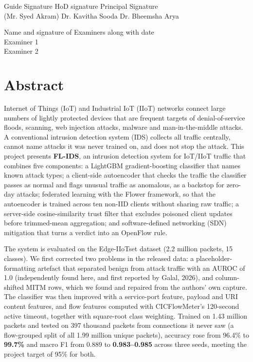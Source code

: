 \documentclass[12pt,a4paper]{report}
\begin{document}
\vspace{2cm}
\begin{flushleft}
Guide Signature\hspace{30mm} HoD signature \hspace{25mm} Principal Signature\\
(Mr. Syed Akram) \hspace{25mm} Dr. Kavitha Sooda \hspace{19mm} Dr. Bheemsha Arya
\end{flushleft}
\vspace{2cm}
\begin{flushleft}
Name and signature of Examiners along with date \\
\vspace {1cm}
Examiner 1 \\
\vspace {1cm}
Examiner 2 \\

\end{flushleft}



\chapter*{Abstract}
\thispagestyle{empty}
Internet of Things (IoT) and Industrial IoT (IIoT) networks connect large numbers of lightly protected devices that are frequent targets of denial-of-service floods, scanning, web injection attacks, malware and man-in-the-middle attacks. A conventional intrusion detection system (IDS) collects all traffic centrally, cannot name attacks it was never trained on, and does not stop the attack. This project presents \textbf{FL-IDS}, an intrusion detection system for IoT/IIoT traffic that combines five components: a LightGBM gradient-boosting classifier that names known attack types; a client-side autoencoder that checks the traffic the classifier passes as normal and flags unusual traffic as anomalous, as a backstop for zero-day attacks; federated learning with the Flower framework, so that the autoencoder is trained across ten non-IID clients without sharing raw traffic; a server-side cosine-similarity trust filter that excludes poisoned client updates before trimmed-mean aggregation; and software-defined networking (SDN) mitigation that turns a verdict into an OpenFlow rule.

The system is evaluated on the Edge-IIoTset dataset (2.2 million packets, 15 classes). We first corrected two problems in the released data: a placeholder-formatting artefact that separated benign from attack traffic with an AUROC of 1.0 (independently found here, and first reported by Galal, 2026), and column-shifted MITM rows, which we found and repaired from the authors' own capture. The classifier was then improved with a service-port feature, payload and URI content features, and flow features computed with CICFlowMeter's 120-second active timeout, together with square-root class weighting. Trained on 1.43 million packets and tested on 397 thousand packets from connections it never saw (a flow-grouped split of all 1.99 million unique packets), accuracy rose from 96.4\% to \textbf{99.7\%} and macro F1 from 0.889 to \textbf{0.983--0.985} across three seeds, meeting the project target of 95\% for both.
\end{document}
